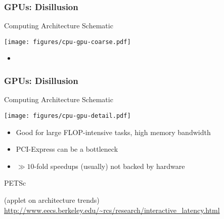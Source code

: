 

\begin{frame}[fragile]
\frametitle{GPUs: Disillusion}
 \begin{block}{Computing Architecture Schematic}
  \begin{center}
   \texttt{[image: figures/cpu-gpu-coarse.pdf]}
  \end{center}

 
 \begin{itemize}
  \item \vspace*{1.03cm}
 \end{itemize}
 \end{block}

\end{frame}

\begin{frame}[fragile]
\frametitle{GPUs: Disillusion}
 \begin{block}{Computing Architecture Schematic}
  \begin{center}
   \texttt{[image: figures/cpu-gpu-detail.pdf]}
  \end{center}

 \begin{itemize}
  \item Good for large FLOP-intensive tasks, high memory bandwidth
  \item PCI-Express can be a bottleneck
  \item $\gg 10$-fold speedups (usually) not backed by hardware
 \end{itemize}
 \end{block}

\end{frame}


\begin{frame}{PETSc}
   \begin{center} (applet on architecture trends) \\[1em]
       {\footnotesize \url{http://www.eecs.berkeley.edu/~rcs/research/interactive\_latency.html}}
    \end{center}
\end{frame}





